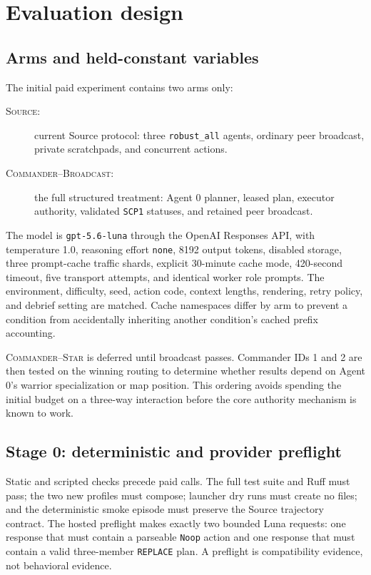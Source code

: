 \documentclass[11pt]{article}
\newcommand{\sourcearm}{\textsc{Source}}
\newcommand{\broadcastarm}{\textsc{Commander--Broadcast}}
\newcommand{\stararm}{\textsc{Commander--Star}}
\newcommand{\scp}{\texttt{SCP1}}
\newcommand{\code}[1]{\texttt{#1}}
\begin{document}
\section{Evaluation design}

\subsection{Arms and held-constant variables}

The initial paid experiment contains two arms only:
\begin{description}
  \item[\sourcearm{}:] current Source protocol: three \code{robust\_all}
  agents, ordinary peer broadcast, private scratchpads, and concurrent actions.
  \item[\broadcastarm{}:] the full structured treatment: Agent 0 planner,
  leased plan, executor authority, validated \scp{} statuses, and retained peer
  broadcast.
\end{description}
The model is \code{gpt-5.6-luna} through the OpenAI Responses API, with
temperature 1.0, reasoning effort \code{none}, 8192 output tokens, disabled
storage, three prompt-cache traffic shards, explicit 30-minute cache mode,
420-second timeout, five transport attempts, and identical worker role prompts.
The environment, difficulty, seed, action code, context lengths, rendering,
retry policy, and debrief setting are matched.  Cache namespaces differ by arm
to prevent a condition from accidentally inheriting another condition's cached
prefix accounting.

\stararm{} is deferred until broadcast passes.  Commander IDs 1 and 2 are then
tested on the winning routing to determine whether results depend on Agent 0's
warrior specialization or map position.  This ordering avoids spending the
initial budget on a three-way interaction before the core authority mechanism is
known to work.

\subsection{Stage 0: deterministic and provider preflight}

Static and scripted checks precede paid calls.  The full test suite and Ruff must
pass; the two new profiles must compose; launcher dry runs must create no files;
and the deterministic smoke episode must preserve the Source trajectory contract.
The hosted preflight makes exactly two bounded Luna requests: one response that
must contain a parseable \code{Noop} action and one response that must contain a
valid three-member \code{REPLACE} plan.  A preflight is compatibility evidence,
not behavioral evidence.
\end{document}
